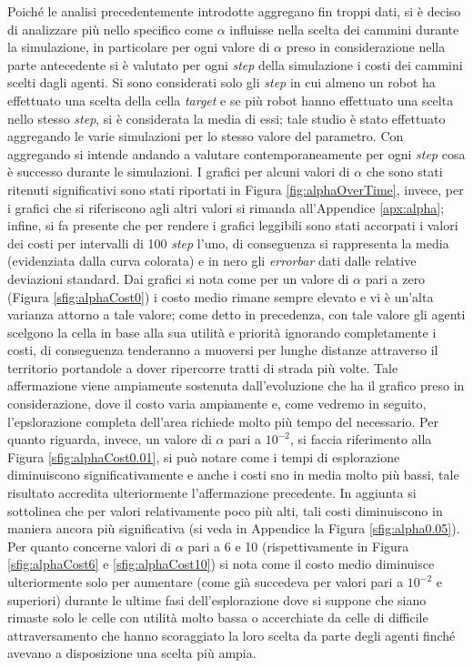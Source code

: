Poiché le analisi precedentemente introdotte aggregano fin troppi dati, si è deciso di analizzare più nello specifico come $\alpha$ influisse nella scelta dei cammini durante la simulazione, in particolare per ogni valore di $\alpha$ preso in considerazione nella parte antecedente si è valutato per ogni \textit{step} della simulazione i costi dei cammini scelti dagli agenti.
Si sono considerati solo gli \textit{step} in cui almeno un robot ha effettuato una scelta della cella \textit{target} e se più robot hanno effettuato una scelta nello stesso \textit{step}, si è considerata la media di essi; tale studio è stato effettuato aggregando le varie simulazioni per lo stesso valore del parametro. 
Con aggregando si intende andando a valutare contemporaneamente per ogni \textit{step} cosa è successo durante le simulazioni.
I grafici per alcuni valori di $\alpha$ che sono stati ritenuti significativi sono stati riportati in Figura \ref{fig:alphaOverTime}, invece, per i grafici che si riferiscono agli altri valori si rimanda all'Appendice \ref{apx:alpha}; infine, si fa presente che per rendere i grafici leggibili sono stati accorpati i valori dei costi per intervalli di 100 \textit{step} l'uno, di conseguenza si rappresenta la media (evidenziata dalla curva colorata) e in nero gli \textit{errorbar} dati dalle relative deviazioni standard.
Dai grafici si nota come per un valore di $\alpha$ pari a zero (Figura \ref{sfig:alphaCost0}) i costo medio rimane sempre elevato e vi è un'alta varianza attorno a tale valore; come detto in precedenza, con tale valore gli agenti scelgono la cella in base alla sua utilità e priorità ignorando completamente i costi, di conseguenza tenderanno a muoversi per lunghe distanze attraverso il territorio portandole a dover ripercorre tratti di strada più volte.
Tale affermazione viene ampiamente sostenuta dall'evoluzione che ha il grafico preso in considerazione, dove il costo varia ampiamente e, come vedremo in seguito, l'epslorazione completa dell'area richiede molto più tempo del necessario.
Per quanto riguarda, invece, un valore di $\alpha$ pari a $10^{-2}$, si faccia riferimento alla Figura \ref{sfig:alphaCost0.01}, si può notare come i tempi di esplorazione diminuiscono significativamente e anche i costi sno in media molto più bassi, tale risultato accredita ulteriormente l'affermazione precedente.
In aggiunta si sottolinea che per valori relativamente poco più alti, tali costi diminuiscono in maniera ancora più significativa (si veda in Appendice la Figura \ref{sfig:alpha0.05}).
Per quanto concerne valori di $\alpha$ pari a 6 e 10 (rispettivamente in Figura \ref{sfig:alphaCost6} e \ref{sfig:alphaCost10}) si nota come il costo medio diminuisce ulteriormente solo per aumentare (come già succedeva per valori pari a $10^{-2}$ e superiori) durante le ultime fasi dell'esplorazione dove si suppone che siano rimaste solo le celle con utilità molto bassa o accerchiate da celle di difficile attraversamento che hanno scoraggiato la loro scelta da parte degli agenti finché avevano a disposizione una scelta più ampia.
